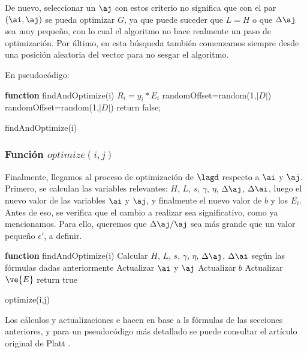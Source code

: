 De nuevo, seleccionar un $\aj$ con estos criterio no significa que con el par $(\ai,\aj)$ se pueda optimizar $G$, ya que puede suceder que $L=H$ o que $\Delta \aj$ sea muy pequeño, con lo cual el algoritmo no hace realmente un paso de optimización. Por último, en esta búsqueda también comenzamos siempre desde una posición aleatoria del vector para no sesgar el algoritmo.

En pseudocódigo:

\begin{function}[H]
\textbf{function} findAndOptimize(i) \;
	$R_i = y_i * E_i$ \;
  randomOffset=random(1,$|D|$) \;
 	randomOffset=random(1,$|D|$) \;
  return false;
\caption{findAndOptimize(i) } 
\end{function}


\subsubsection{Función $optimize(i,j)$}

Finalmente, llegamos al proceso de optimización de $\lagd$ respecto a $\ai$ y $\aj$. Primero, se calculan las variables relevantes: $H$, $L$, $s$, $\gamma$, $\eta$, $\Delta \aj$, $\Delta \ai$, luego el nuevo valor de las variables $\ai$ y $\aj$, y finalmente el nuevo valor de $b$ y los $E_i$. Antes de eso, se verifica que el cambio a realizar sea significativo, como ya mencionamos. Para ello, queremos que $\Delta \aj / \aj$ sea más grande que un valor pequeño $\epsilon'$, a definir.


\begin{function}[H]
\textbf{function} findAndOptimize(i) \;
	Calcular $H$, $L$, $s$, $\gamma$, $\eta$, $\Delta \aj$, $\Delta \ai$ según las fórmulas dadas anteriormente \;
	Actualizar $\ai$ y $\aj$ \;
	Actualizar $b$ \;
	Actualizar $\ve{E}$ \;
	return true \;
\caption{optimize(i,j) } 
\end{function}



Los cálculos y actualizaciones e hacen en base a ls fórmulas de las secciones anteriores, y para un pseudocódigo más detallado se puede consultar el artículo original de Platt \cite{platt1998}.

